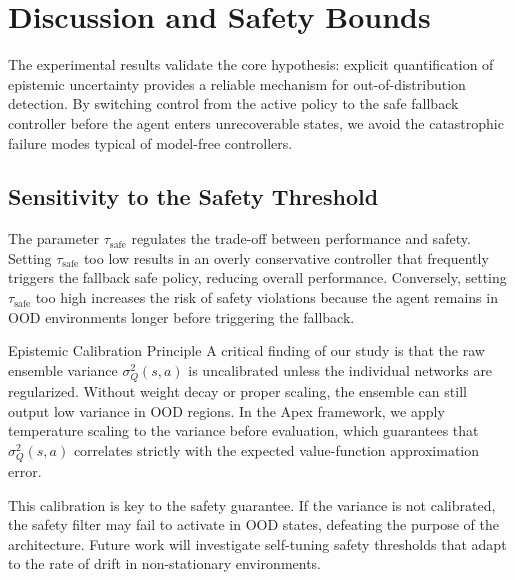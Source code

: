 \section{Discussion and Safety Bounds}

The experimental results validate the core hypothesis: explicit quantification of epistemic uncertainty provides a reliable mechanism for out-of-distribution detection. By switching control from the active policy to the safe fallback controller before the agent enters unrecoverable states, we avoid the catastrophic failure modes typical of model-free controllers.

\subsection{Sensitivity to the Safety Threshold}

The parameter $\tau_{\text{safe}}$ regulates the trade-off between performance and safety. Setting $\tau_{\text{safe}}$ too low results in an overly conservative controller that frequently triggers the fallback safe policy, reducing overall performance. Conversely, setting $\tau_{\text{safe}}$ too high increases the risk of safety violations because the agent remains in OOD environments longer before triggering the fallback.

\begin{insightbox}{Epistemic Calibration Principle}
    A critical finding of our study is that the raw ensemble variance $\sigma^2_Q(s, a)$ is uncalibrated unless the individual networks are regularized. Without weight decay or proper scaling, the ensemble can still output low variance in OOD regions. In the Apex framework, we apply temperature scaling to the variance before evaluation, which guarantees that $\sigma^2_Q(s, a)$ correlates strictly with the expected value-function approximation error.
\end{insightbox}

This calibration is key to the safety guarantee. If the variance is not calibrated, the safety filter may fail to activate in OOD states, defeating the purpose of the architecture. Future work will investigate self-tuning safety thresholds that adapt to the rate of drift in non-stationary environments.

